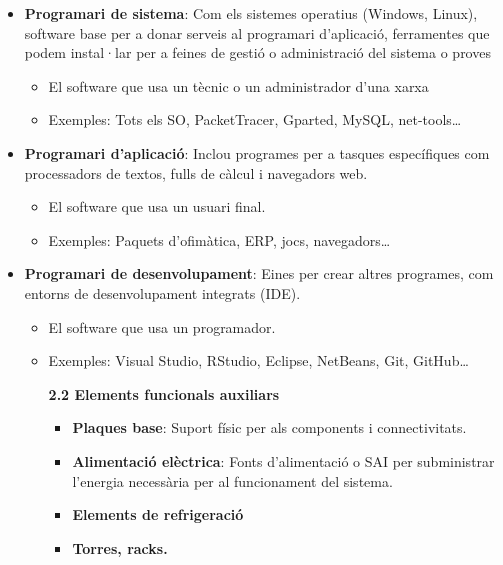 \documentclass[
  12 pt,
  a4paper,
]{article}
\providecommand{\tightlist}{%
  \setlength{\itemsep}{0pt}\setlength{\parskip}{0pt}}
\begin{document}
\begin{itemize}
\item
  \textbf{Programari de sistema}: Com els sistemes operatius (Windows,
  Linux), software base per a donar serveis al programari d'aplicació,
  ferramentes que podem instal·lar per a feines de gestió o
  administració del sistema o proves

  \begin{itemize}
  \tightlist
  \item
    El software que usa un tècnic o un administrador d'una xarxa
  \item
    Exemples: Tots els SO, PacketTracer, Gparted, MySQL,
    net-tools\ldots{}
  \end{itemize}
\item
  \textbf{Programari d'aplicació}: Inclou programes per a tasques
  específiques com processadors de textos, fulls de càlcul i navegadors
  web.

  \begin{itemize}
  \tightlist
  \item
    El software que usa un usuari final.
  \item
    Exemples: Paquets d'ofimàtica, ERP, jocs, navegadors\ldots{}
  \end{itemize}
\item
  \textbf{Programari de desenvolupament}: Eines per crear altres
  programes, com entorns de desenvolupament integrats (IDE).

  \begin{itemize}
  \item
    El software que usa un programador.
  \item
    Exemples: Visual Studio, RStudio, Eclipse, NetBeans, Git,
    GitHub\ldots{}

    \textbf{2.2 Elements funcionals auxiliars}

    \begin{itemize}
    \tightlist
    \item
      \textbf{Plaques base}: Suport físic per als components i
      connectivitats.
    \item
      \textbf{Alimentació elèctrica}: Fonts d'alimentació o SAI per
      subministrar l'energia necessària per al funcionament del sistema.
    \item
      \textbf{Elements de refrigeració}
    \item
      \textbf{Torres, racks.}
    \end{itemize}
  \end{itemize}
\end{itemize}
\end{document}
